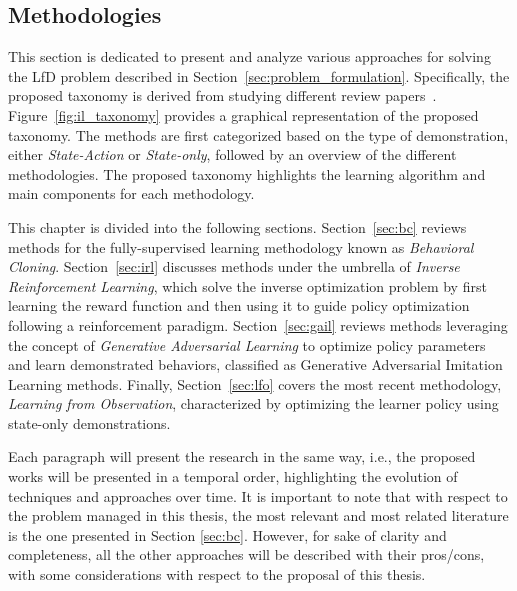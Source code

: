 \subsection{Methodologies}
\label{sec:lfd}
This section is dedicated to present and analyze various approaches for solving the LfD problem described in Section~\ref{sec:problem_formulation}. Specifically,  the proposed taxonomy is derived from studying different review papers~\cite{kaelbling1996reinforcement_survey,argall2009robot_learning_from_demonstration,hussein2017imitation_learning_survey,fang2019survey,zheng2021imitation_progress_taxonomies_opportunities,zare2024survey}. Figure~\ref{fig:il_taxonomy} provides a graphical representation of the proposed taxonomy. The methods are first categorized based on the type of demonstration, either \textit{State-Action} or \textit{State-only}, followed by an overview of the different methodologies. The proposed taxonomy highlights the learning algorithm and main components for each methodology.

This chapter is divided into the following sections. Section~\ref{sec:bc} reviews methods for the fully-supervised learning methodology known as \textit{Behavioral Cloning}. 
\newline Section~\ref{sec:irl} discusses methods under the umbrella of \textit{Inverse Reinforcement Learning}, which solve the inverse optimization problem by first learning the reward function and then using it to guide policy optimization following a reinforcement paradigm.
\newline Section~\ref{sec:gail} reviews methods leveraging the concept of \textit{Generative Adversarial Learning} to optimize policy parameters and learn demonstrated behaviors, classified as Generative Adversarial Imitation Learning methods.
\newline Finally, Section~\ref{sec:lfo} covers the most recent methodology, \textit{Learning from Observation}, characterized by optimizing the learner policy using state-only demonstrations.


Each paragraph will present the research in the same way, i.e., the proposed works will be presented in a temporal order, highlighting the evolution of techniques and approaches over time.
It is important to note that with respect to the problem managed in this thesis, the most relevant and most related literature is the one presented in Section \ref{sec:bc}. However, for sake of clarity and completeness, all the other approaches will be described with their pros/cons, with some considerations with respect to the proposal of this thesis.











